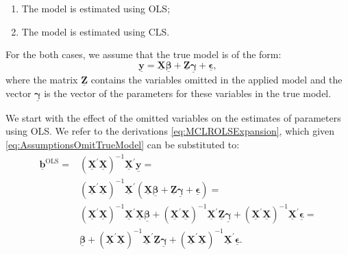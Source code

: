 \documentclass[
]{book}
\providecommand{\tightlist}{%
  \setlength{\itemsep}{0pt}\setlength{\parskip}{0pt}}
\begin{document}
\begin{enumerate}
\def\labelenumi{\arabic{enumi}.}
\tightlist
\item
  The model is estimated using OLS;
\item
  The model is estimated using CLS.
\end{enumerate}

For the both cases, we assume that the true model is of the form:
\begin{equation}
    \underline{\mathbf{y}} = \underline{\mathbf{X}} \underline{\boldsymbol{\beta}} + \underline{\mathbf{Z}} \underline{\boldsymbol{\gamma}} + \underline{\boldsymbol{\epsilon}},
    \label{eq:AssumptionsOmitTrueModel}
\end{equation}
where the matrix \(\underline{\mathbf{Z}}\) contains the variables omitted in the applied model and the vector \(\underline{\boldsymbol{\gamma}}\) is the vector of the parameters for these variables in the true model.

We start with the effect of the omitted variables on the estimates of parameters using OLS. We refer to the derivations \eqref{eq:MCLROLSExpansion}, which given \eqref{eq:AssumptionsOmitTrueModel} can be substituted to:
\begin{equation}
    \begin{aligned}
    \underline{\boldsymbol{b}}^{\text{OLS}} =
        & \left( \underline{\mathbf{X}}^\prime \underline{\mathbf{X}} \right)^{-1} \underline{\mathbf{X}}^\prime \underline{\mathbf{y}} = \\
        & \left( \underline{\mathbf{X}}^\prime \underline{\mathbf{X}} \right)^{-1} \underline{\mathbf{X}}^\prime \left(\underline{\mathbf{X}} \underline{\boldsymbol{\beta}} + \underline{\mathbf{Z}} \underline{\boldsymbol{\gamma}} + \underline{\boldsymbol{\epsilon}} \right) = \\
        & \left( \underline{\mathbf{X}}^\prime \underline{\mathbf{X}} \right)^{-1} \underline{\mathbf{X}}^\prime \underline{\mathbf{X}} \underline{\boldsymbol{\beta}} + \left( \underline{\mathbf{X}}^\prime \underline{\mathbf{X}} \right)^{-1} \underline{\mathbf{X}}^\prime \underline{\mathbf{Z}} \underline{\boldsymbol{\gamma}} + \left( \underline{\mathbf{X}}^\prime \underline{\mathbf{X}} \right)^{-1} \underline{\mathbf{X}}^\prime \underline{\boldsymbol{\epsilon}} = \\
        & \underline{\boldsymbol{\beta}} + \left( \underline{\mathbf{X}}^\prime \underline{\mathbf{X}} \right)^{-1} \underline{\mathbf{X}}^\prime \underline{\mathbf{Z}} \underline{\boldsymbol{\gamma}} + \left( \underline{\mathbf{X}}^\prime \underline{\mathbf{X}} \right)^{-1} \underline{\mathbf{X}}^\prime \underline{\boldsymbol{\epsilon}} .
    \end{aligned}
    \label{eq:AssumptionsOmitOLS01}
\end{equation}
\end{document}

